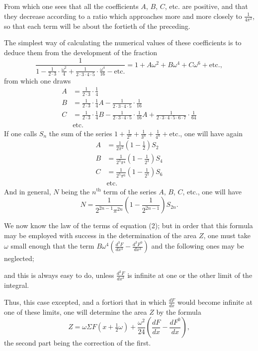 \documentclass{article}
\begin{document}
From which one sees that all the coefficients $A$, $B$, $C$, etc. are positive, and that they decrease according to a ratio which approaches more and more closely to $\frac{1}{4\pi^{2}}$, so that each term will be about the fortieth of the preceding.

The simplest way of calculating the numerical values of these coefficients is to deduce them from the development of the fraction
\[ \frac{1}{1-\frac{1}{2\cdot3}\cdot\frac{\omega^{2}}{4}+\frac{1}{2\cdot3\cdot4\cdot5}\cdot\frac{\omega^{4}}{16}-\text{etc.}}=1+A\omega^{2}+B\omega^{4}+C\omega^{6}+\text{etc.}, \]
from which one draws
\[ \begin{aligned} A&=\frac{1}{2\cdot3}\cdot\frac{1}{4}\\ B&=\frac{1}{2\cdot3}\cdot\frac{1}{4}A-\frac{1}{2\cdot3\cdot4\cdot5}\cdot\frac{1}{16}\\ C&=\frac{1}{2\cdot3}\cdot\frac{1}{4}B-\frac{1}{2\cdot3\cdot4\cdot5}\cdot\frac{1}{16}A+\frac{1}{2\cdot3\cdot4\cdot5\cdot6\cdot7}\cdot\frac{1}{64}\\ &\text{etc.} \end{aligned} \]
If one calls $S_{n}$ the sum of the series $1+\frac{1}{2^{n}}+\frac{1}{3^{n}}+\frac{1}{4^{n}}+\text{etc.}$, one will have again
\[ \begin{aligned} A&=\frac{1}{2\pi^{2}}\left(1-\frac{1}{2}\right)S_{2}\\ B&=\frac{1}{2^{3}\pi^{4}}\left(1-\frac{1}{2^{3}}\right)S_{4}\\ C&=\frac{1}{2^{5}\pi^{6}}\left(1-\frac{1}{2^{5}}\right)S_{6}\\ &\text{etc.} \end{aligned} \]
And in general, $N$ being the $n^{\text{th}}$ term of the series $A$, $B$, $C$, etc., one will have
\[ N=\frac{1}{2^{2n-1}\pi^{2n}}\left(1-\frac{1}{2^{2n-1}}\right)S_{2n}. \]

We now know the law of the terms of equation (2); but in order that this formula may be employed with success in the determination of the area $Z$, one must take $\omega$ small enough that the term $B\omega^{4}\left(\frac{d^{3}F}{dx^{3}}-\frac{d^{3}F^{0}}{dx^{3}}\right)$ and the following ones may be neglected;

and this is always easy to do, unless $\frac{d^{3}F}{dx^{3}}$ is infinite at one or the other limit of the integral.

Thus, this case excepted, and a fortiori that in which $\frac{dF}{dx}$ would become infinite at one of these limits, one will determine the area $Z$ by the formula
\[ Z=\omega\Sigma F(x+\tfrac{1}{2}\omega)+\frac{\omega^{2}}{24}\left(\frac{dF}{dx}-\frac{dF^{0}}{dx}\right), \]
the second part being the correction of the first.
\end{document}
